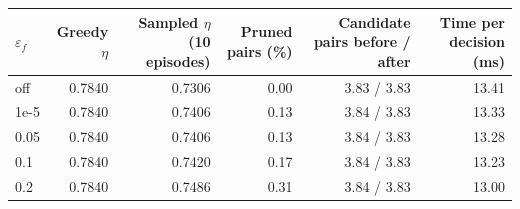 \begin{tabular}{lrrrrr}
\toprule
$\varepsilon_f$ & Greedy $\eta$ & Sampled $\eta$ (10 episodes) & Pruned pairs (\%) & Candidate pairs before / after & Time per decision (ms) \\
\midrule
off & 0.7840 & 0.7306 & 0.00 & 3.83 / 3.83 & 13.41 \\
1e-5 & 0.7840 & 0.7406 & 0.13 & 3.84 / 3.83 & 13.33 \\
0.05 & 0.7840 & 0.7406 & 0.13 & 3.84 / 3.83 & 13.28 \\
0.1 & 0.7840 & 0.7420 & 0.17 & 3.84 / 3.83 & 13.23 \\
0.2 & 0.7840 & 0.7486 & 0.31 & 3.84 / 3.83 & 13.00 \\
\bottomrule
\end{tabular}
